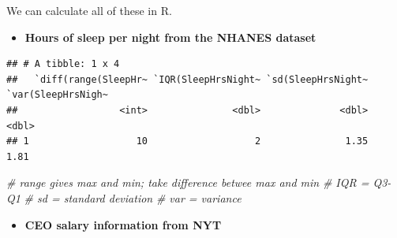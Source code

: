 \documentclass[
]{book}
\newenvironment{Shaded}{\begin{snugshade}}{\end{snugshade}}
\newcommand{\CommentTok}[1]{\textcolor[rgb]{0.56,0.35,0.01}{\textit{#1}}}
\newcommand{\DataTypeTok}[1]{\textcolor[rgb]{0.13,0.29,0.53}{#1}}
\newcommand{\KeywordTok}[1]{\textcolor[rgb]{0.13,0.29,0.53}{\textbf{#1}}}
\newcommand{\NormalTok}[1]{#1}
\newcommand{\OperatorTok}[1]{\textcolor[rgb]{0.81,0.36,0.00}{\textbf{#1}}}
\newcommand{\OtherTok}[1]{\textcolor[rgb]{0.56,0.35,0.01}{#1}}
\newcommand{\StringTok}[1]{\textcolor[rgb]{0.31,0.60,0.02}{#1}}
\providecommand{\tightlist}{%
  \setlength{\itemsep}{0pt}\setlength{\parskip}{0pt}}
\begin{document}
We can calculate all of these in R.

\begin{itemize}
\tightlist
\item
  \textbf{Hours of sleep per night from the NHANES dataset}
\end{itemize}

\begin{Shaded}
\end{Shaded}

\begin{verbatim}
## # A tibble: 1 x 4
##   `diff(range(SleepHr~ `IQR(SleepHrsNight~ `sd(SleepHrsNight~ `var(SleepHrsNigh~
##                  <int>               <dbl>              <dbl>              <dbl>
## 1                   10                   2               1.35               1.81
\end{verbatim}

\begin{Shaded}
\begin{Highlighting}[]
\CommentTok{# range gives max and min; take difference betwee max and min}
\CommentTok{# IQR = Q3-Q1}
\CommentTok{# sd = standard deviation}
\CommentTok{# var = variance}
\end{Highlighting}
\end{Shaded}

\begin{itemize}
\tightlist
\item
  \textbf{CEO salary information from NYT}
\end{itemize}

\begin{Shaded}
\end{Shaded}
\end{document}
